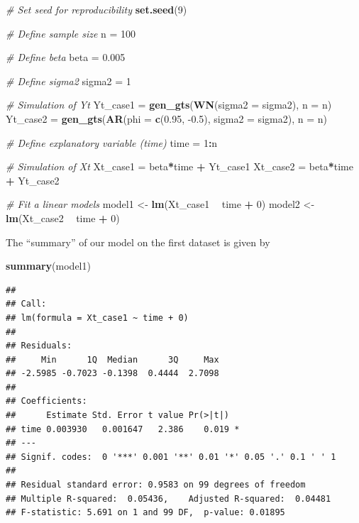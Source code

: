 \documentclass[]{book}
\newenvironment{Shaded}{\begin{snugshade}}{\end{snugshade}}
\newcommand{\CommentTok}[1]{\textcolor[rgb]{0.56,0.35,0.01}{\textit{#1}}}
\newcommand{\DataTypeTok}[1]{\textcolor[rgb]{0.13,0.29,0.53}{#1}}
\newcommand{\DecValTok}[1]{\textcolor[rgb]{0.00,0.00,0.81}{#1}}
\newcommand{\FloatTok}[1]{\textcolor[rgb]{0.00,0.00,0.81}{#1}}
\newcommand{\KeywordTok}[1]{\textcolor[rgb]{0.13,0.29,0.53}{\textbf{#1}}}
\newcommand{\NormalTok}[1]{#1}
\newcommand{\OperatorTok}[1]{\textcolor[rgb]{0.81,0.36,0.00}{\textbf{#1}}}
\newcommand{\StringTok}[1]{\textcolor[rgb]{0.31,0.60,0.02}{#1}}
\theoremstyle{definition}
\theoremstyle{definition}
\theoremstyle{definition}
\theoremstyle{remark}
\begin{document}
\begin{Shaded}
\begin{Highlighting}[]
\CommentTok{# Set seed for reproducibility}
\KeywordTok{set.seed}\NormalTok{(}\DecValTok{9}\NormalTok{)}

\CommentTok{# Define sample size}
\NormalTok{n =}\StringTok{ }\DecValTok{100}

\CommentTok{# Define beta}
\NormalTok{beta =}\StringTok{ }\FloatTok{0.005}

\CommentTok{# Define sigma2}
\NormalTok{sigma2 =}\StringTok{ }\DecValTok{1}

\CommentTok{# Simulation of Yt}
\NormalTok{Yt_case1 =}\StringTok{ }\KeywordTok{gen_gts}\NormalTok{(}\KeywordTok{WN}\NormalTok{(}\DataTypeTok{sigma2 =}\NormalTok{ sigma2), }\DataTypeTok{n =}\NormalTok{ n)}
\NormalTok{Yt_case2 =}\StringTok{ }\KeywordTok{gen_gts}\NormalTok{(}\KeywordTok{AR}\NormalTok{(}\DataTypeTok{phi =} \KeywordTok{c}\NormalTok{(}\FloatTok{0.95}\NormalTok{, }\FloatTok{-0.5}\NormalTok{), }\DataTypeTok{sigma2 =}\NormalTok{ sigma2), }\DataTypeTok{n =}\NormalTok{ n)}

\CommentTok{# Define explanatory variable (time)}
\NormalTok{time =}\StringTok{ }\DecValTok{1}\OperatorTok{:}\NormalTok{n}

\CommentTok{# Simulation of Xt}
\NormalTok{Xt_case1 =}\StringTok{ }\NormalTok{beta}\OperatorTok{*}\NormalTok{time }\OperatorTok{+}\StringTok{ }\NormalTok{Yt_case1}
\NormalTok{Xt_case2 =}\StringTok{ }\NormalTok{beta}\OperatorTok{*}\NormalTok{time }\OperatorTok{+}\StringTok{ }\NormalTok{Yt_case2}

\CommentTok{# Fit a linear models}
\NormalTok{model1 <-}\StringTok{ }\KeywordTok{lm}\NormalTok{(Xt_case1 }\OperatorTok{~}\StringTok{ }\NormalTok{time }\OperatorTok{+}\StringTok{ }\DecValTok{0}\NormalTok{)}
\NormalTok{model2 <-}\StringTok{ }\KeywordTok{lm}\NormalTok{(Xt_case2 }\OperatorTok{~}\StringTok{ }\NormalTok{time }\OperatorTok{+}\StringTok{ }\DecValTok{0}\NormalTok{)}
\end{Highlighting}
\end{Shaded}

The ``summary'' of our model on the first dataset is given by

\begin{Shaded}
\begin{Highlighting}[]
\KeywordTok{summary}\NormalTok{(model1)}
\end{Highlighting}
\end{Shaded}

\begin{verbatim}
## 
## Call:
## lm(formula = Xt_case1 ~ time + 0)
## 
## Residuals:
##     Min      1Q  Median      3Q     Max 
## -2.5985 -0.7023 -0.1398  0.4444  2.7098 
## 
## Coefficients:
##      Estimate Std. Error t value Pr(>|t|)  
## time 0.003930   0.001647   2.386    0.019 *
## ---
## Signif. codes:  0 '***' 0.001 '**' 0.01 '*' 0.05 '.' 0.1 ' ' 1
## 
## Residual standard error: 0.9583 on 99 degrees of freedom
## Multiple R-squared:  0.05436,    Adjusted R-squared:  0.04481 
## F-statistic: 5.691 on 1 and 99 DF,  p-value: 0.01895
\end{verbatim}
\end{document}
